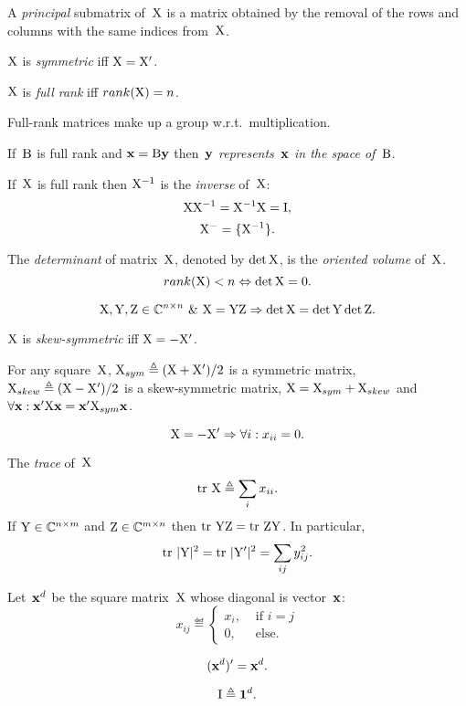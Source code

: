 \documentclass[10pt,a4paper]{article}
\theoremstyle{plain} \newtheorem{Lem}{Lemma}
\begin{document}
A {\em principal} submatrix of~$\mathrm X$ is a matrix obtained by the removal of the rows and columns with the same indices from~$\mathrm X$.

$\mathrm X$ is {\em symmetric} iff $\mathrm X = \mathrm X'$.

$\mathrm X$ is {\em full rank} iff $rank(\mathrm X) = n$.

Full-rank matrices make up a group w.r.t.~multiplication.

If~$\mathrm B$ is full rank and $\mathbf x = \mathrm B \mathbf y$ then~$\mathbf y$ {\em represents~$\mathbf x$ in the space of~$\mathrm B$}.

If~$\mathrm X$ is full rank then $\mathrm X^{-1}$ is the {\em inverse} of~$\mathrm X$:
$$ \mathrm X \mathrm X^{-1} = \mathrm X^{-1} \mathrm X = \mathrm I, $$
$$ \mathrm X^- = \{\mathrm X^{-1}\} . $$

The {\em determinant} of matrix~$\mathrm X$, denoted by $\det \mathrm X$, is the {\em oriented volume} of~$\mathrm X$.
$$ rank (\mathrm X) < n \Leftrightarrow \det \mathrm X = 0. $$

$$ \mathrm X, \mathrm Y, \mathrm Z \in \mathbb C^{n \times n} \ \& \  \mathrm X = \mathrm Y \mathrm Z \Rightarrow \det \mathrm X = \det \mathrm Y \det \mathrm Z. $$

$\mathrm X$ is {\em skew-symmetric} iff $\mathrm X = - \mathrm X'$.

For any square~$\mathrm X$,
$\mathrm X_{sym} \triangleq (\mathrm X + \mathrm X') / 2$ is a symmetric matrix,
$\mathrm X_{skew} \triangleq (\mathrm X - \mathrm X') / 2$ is a skew-symmetric matrix,
$\mathrm X = \mathrm X_{sym} + \mathrm X_{skew}$
and $\forall \mathbf x : \mathbf x' \mathrm X \mathbf x = \mathbf x' \mathrm X_{sym} \mathbf x$.

$$ \mathrm X = - \mathrm X' \Rightarrow \forall i : x_{ii} = 0. $$

The {\em trace} of~$\mathrm X$ 
$$\mathrm {tr} \  \mathrm X \triangleq \sum_i x_{ii}.$$
If $\mathrm Y \in \mathbb C^{n \times m}$ and $\mathrm Z \in \mathbb C^{m \times n}$ then $\mathrm {tr} \  \mathrm Y \mathrm Z = \mathrm {tr} \  \mathrm Z \mathrm Y$.
In particular, 
$$ \mathrm {tr} \  |\mathrm Y|^2 = \mathrm {tr} \  |\mathrm Y'|^2 = \sum_{ij} y^2_{ij}. $$

Let~$\mathbf x^d$ be the square matrix~$\mathrm X$ whose diagonal is vector~$\mathbf x$: 
\begin{equation*}
x_{ij} \eqdef 
  \begin{cases}
    x_i, &\text{ if } i = j\\
    0,   &\text{ else.}
  \end{cases}
\end{equation*}

$$ (\mathbf x^d)' = \mathbf x^d. $$

$$ \mathrm I \triangleq \mathbf 1^d. $$
\end{document}
